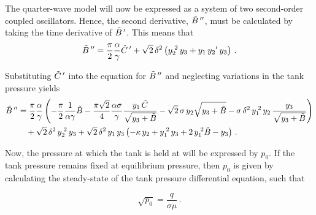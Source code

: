 The quarter-wave model will now be expressed as a system of two second-order coupled oscillators. Hence, the second derivative, $\tilde{B}\,{''}$, must be calculated by taking the time derivative of $\tilde{B}\,{'}$. This means that
~
\begin{equation*}
    \tilde{B}\,{''} =
    \frac{\pi}{2} \frac{\alpha}{\gamma} \tilde{C}\,{'}
    + \sqrt{2} \, \delta^2 \left( y_2^{\;2} \, y_3
    + y_1 \, y_2{'} \, y_3
    \right) \, .
\end{equation*}

Substituting $\tilde{C}\,{'}$ into the equation for $\tilde{B}\,{''}$ and neglecting variations in the tank pressure yields
~
\begin{equation} \label{eq: QWMOscillatorB}
\begin{split}
    \ddash{\tilde{B}\,} &= \frac{\pi}{2} \frac{\alpha}{\gamma} \left( - \frac{\pi}{2} \frac{1}{\alpha \gamma} \tilde{B} - \frac{\pi \sqrt{2}}{4} \frac{\alpha \sigma}{\gamma} \frac{y_1 \, \tilde{C}}{\sqrt{y_3 + \tilde{B}}} - \sqrt{2} \, \sigma \, y_2 \sqrt{y_3 + \tilde{B}} - \sigma \, \delta^2 \, y_1\power{2} \, y_2 \, \frac{y_3}{\sqrt{y_3 + \tilde{B}}} \right)
    \\ & \quad %
    + \sqrt{2} \, \delta^2 \, y_2\power{2} \, y_3
    + \sqrt{2} \, \delta^2 \, y_1 \, y_3 \left( - \kappa \, y_2 + y_1\power{2} \, y_3 + 2 \, y_1 \power{2} \tilde{B} - y_3 \right) \, .
\end{split}
\end{equation}

Now, the pressure at which the tank is held at will be expressed by $p_0$. If the tank pressure remains fixed at equilibrium pressure, then $p_0$ is given by calculating the steady-state of the tank pressure differential equation, such that

\begin{equation*}
    \sqrt{p_0} = \frac{q}{\sigma \mu} \, .
\end{equation*}

